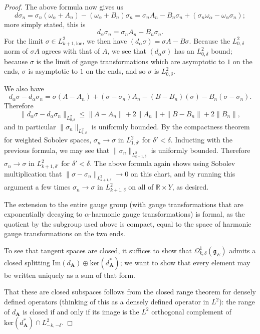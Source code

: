 \documentclass[10pt,a4paper]{amsart}
\theoremstyle{definition}
\theoremstyle{remark}
\numberwithin{figure}{qchap}
\begin{document}
\begin{proof}
The above formula now gives us 
$$d\sigma_n = \sigma_n (\omega_\alpha + A_n) - (\omega_\alpha + B_n) \sigma_n = \sigma_n A_n - B_n \sigma_n + (\sigma_n \omega_\alpha - \omega_\alpha \sigma_n);$$ 
more simply stated, this is 
$$d_\alpha \sigma_n = \sigma_n A_n - B_n \sigma_n.$$ 
For the limit $\sigma \in L^2_{k+1,\text{loc}}$, we then have $(d_\alpha \sigma) = \sigma A  - B\sigma$. Because the $L^2_{0,\delta}$ norm of $\sigma A$ agrees with that of $A$, we see that $(d_\alpha \sigma)$ has an $L^2_{0,\delta}$ bound; because $\sigma$ is the limit of gauge transformations which are asymptotic to $1$ on the ends, $\sigma$ is asymptotic to $1$ on the ends, and so $\sigma$ is $L^2_{0,\delta}$.

We also have $$d_\alpha\sigma - d_\alpha\sigma_n = \sigma(A-A_n) + (\sigma - \sigma_n)A_n - (B - B_n)(\sigma) - B_n(\sigma - \sigma_n).$$ Therefore $$\|d_\alpha \sigma - d_\alpha \sigma_n\|_{L^2_{0,\delta}} \leq \|A - A_n\| + 2\|A_n\| + \|B - B_n\| +2\|B_n\|,$$ and in particular $\|\sigma_n\|_{L^2_{1,\delta}}$ is uniformly bounded. By the compactness theorem for weighted Sobolev spaces, $\sigma_n \to \sigma$ in $L^2_{1,\delta'}$ for $\delta' < \delta$. Inducting with the previous formula, we may see that $\|\sigma_n\|_{L^2_{k+1,\delta}}$ is uniformly bounded. Therefore $\sigma_n \to \sigma$ in $L^2_{k+1,\delta'}$ for $\delta' < \delta$. The above formula again shows using Sobolev multiplication that $\|\sigma - \sigma_n\|_{L^2_{k+1,\delta}} \to 0$ on this chart, and by running this argument a few times $\sigma_n \to \sigma$ in $L^2_{k+1,\delta}$ on all of $\mathbb R \times Y$, as desired.

The extension to the entire gauge group (with gauge transformations that are exponentially decaying to $\alpha$-harmonic gauge transformations) is formal, as the quotient by the subgroup used above is compact, equal to the space of harmonic gauge transformations on the two ends.

To see that tangent spaces are closed, it suffices to show that $\Omega^1_{k,\delta}(\mathfrak g_E)$ admits a closed splitting $\text{Im}(d_{\mathbf{A}}) \oplus \text{ker}(d_{\mathbf{A}}^*)$; we want to show that every element may be written uniquely as a sum of that form.

That these are closed subspaces follows from the closed range theorem for densely defined operators (thinking of this as a densely defined operator in $L^2$): the range of $d_{\mathbf{A}}$ is closed if and only if its image is the $L^2$ orthogonal complement of $\text{ker}(d_{\mathbf{A}}^*) \cap L^2_{-k,-\delta}$. 


\end{proof}
\end{document}
